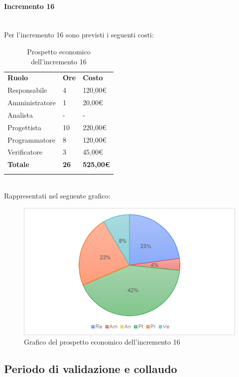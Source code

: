 \paragraph{Incremento 16} \mbox{} \\
Per l'incremento 16 sono previsti i seguenti costi:
\begin{longtable} {
		>{}p{32mm}
		>{}p{20mm}
		>{}p{20mm}
	}
	\rowcolor{gray!50}
	
	\textbf{Ruolo} & \textbf{Ore} & \textbf{Costo} \TBstrut \\
	Responsabile & 4 & 120,00\euro{} \TBstrut \\
	Amministratore & 1 & 20,00\euro{} \TBstrut \\
	Analista & - & - \TBstrut \\
	Progettista & 10 & 220,00\euro{}\TBstrut \\
	Programmatore & 8 & 120,00\euro{} \TBstrut \\
	Verificatore & 3 & 45,00\euro{} \TBstrut \\
	\textbf{Totale} & \textbf{26}& \textbf{525,00\euro{}} \TBstrut \\	
	\rowcolor{white}
	\caption{Prospetto economico dell'incremento 16}
\end{longtable} \mbox{} \\
Rappresentati nel seguente grafico: \mbox{}
\begin{figure} [H]
	\includegraphics[width=\linewidth]{./img/Grafici/28.png}
	\caption{Grafico del prospetto economico dell'incremento 16}
\end{figure}
\subsection{Periodo di validazione e collaudo}
